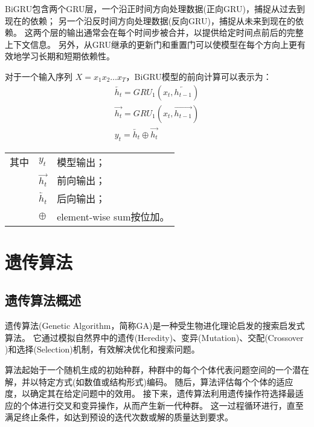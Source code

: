 BiGRU包含两个GRU层，一个沿正时间方向处理数据(正向GRU)，捕捉从过去到现在的依赖；
另一个沿反时间方向处理数据(反向GRU)，捕捉从未来到现在的依赖。
这两个层的输出通常会在每个时间步被合并，以提供给定时间点前后的完整上下文信息。
另外，从GRU继承的更新门和重置门可以使模型在每个方向上更有效地学习长期和短期依赖性。

对于一个输入序列 $X = x_1 x_2 \dots x_T$，BiGRU模型的前向计算可以表示为：
\begin{gather}
  \overleftarrow{h_t} = GRU_1(x_t,\overleftarrow{h_{t-1}}) \label{eq:bigru_htleft} \\
  \overrightarrow{h_t} = GRU_1(x_t,\overrightarrow{h_{t-1}}) \label{eq:bigru_htright} \\
  y_t = \overleftarrow{h_t} \oplus \overrightarrow{h_t} \label{eq:bigru_out}
\end{gather}
\begin{flushleft}
  \renewcommand\arraystretch{1.25}
  \begin{tabularx}{\textwidth}{@{}>{\normalsize\rm}l@{\quad}>{\normalsize\rm}l@{——}>{\normalsize\rm}X@{}}
  其中
  &  $y_t$ &模型输出；\\
  &  $\overrightarrow{h_t}$ &前向输出；\\
  &  $\overleftarrow{h_t} $ &后向输出；\\
  &  $\oplus$ & element-wise sum按位加。\\
  \end{tabularx}\vspace{.5ex}%
\end{flushleft}

\section{遗传算法}
\label{sec:GA}
\subsection{遗传算法概述}
遗传算法(Genetic Algorithm，简称GA)\cite{alhijawi2023genetic,gen2023genetic}是一种受生物进化理论启发的搜索启发式算法。
它通过模拟自然界中的遗传(Heredity)、变异(Mutation)、交配(Crossover )和选择(Selection)机制，有效解决优化和搜索问题。\par

算法起始于一个随机生成的初始种群，种群中的每个个体代表问题空间的一个潜在解，并以特定方式(如数值或结构形式)编码。
随后，算法评估每个个体的适应度，以确定其在给定问题中的效用。
接下来，遗传算法利用遗传操作符选择最适应的个体进行交叉和变异操作，从而产生新一代种群。
这一过程循环进行，直至满足终止条件，如达到预设的迭代次数或解的质量达到要求。

